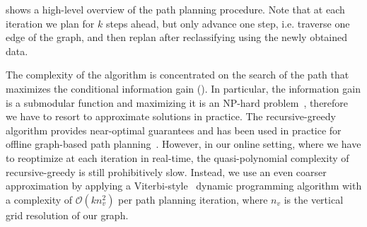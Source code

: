  shows a high-level overview of the path planning
procedure. Note that at each iteration we plan for $k$ steps ahead, but
only advance one step, i.e. traverse one edge of the graph, and then
replan after reclassifying using the newly obtained data.

The complexity of the algorithm is concentrated on the search of the path that
maximizes the conditional information gain ().
In particular, the information gain is a submodular function and maximizing it
is an NP-hard problem~\cite{krause08}, therefore we have to resort to
approximate solutions in practice. The recursive-greedy~\cite{chekuri05}
algorithm provides near-optimal guarantees and has been used in practice
for offline graph-based path planning~\cite{singh09}. However, in our online
setting, where we have to reoptimize at each iteration in real-time, the
quasi-polynomial complexity of recursive-greedy is still prohibitively slow.
Instead, we use an even coarser
approximation by applying a Viterbi-style~\cite{forney73} dynamic programming
algorithm with a complexity of $\mathcal{O}(k n_v^2)$ per path planning
iteration, where $n_v$ is the vertical grid resolution of our graph.

